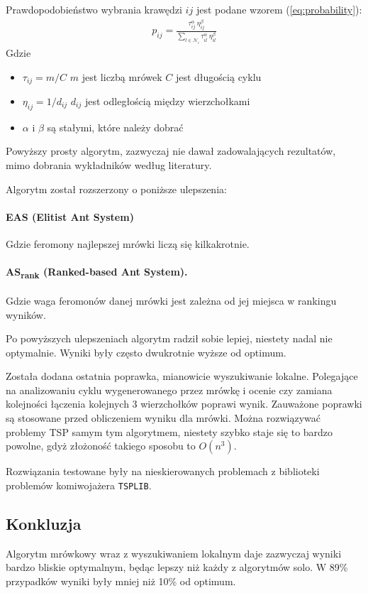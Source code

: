 \documentclass{article}
\begin{document}
Prawdopodobieństwo wybrania krawędzi $ij$ jest podane wzorem
(\ref{eq:probability}):
\begin{align}
    p_{ij} = \frac{\tau_{ij}^\alpha \ \eta_{ij} ^\beta}{\sum_{l\in\mathcal{N}_i} \tau_{il}^\alpha \ \eta_{il} ^\beta} \label{eq:probability}
\end{align}
Gdzie
\begin{itemize}
    \item $\tau_{ij} = m/C$
          \subitem $m$ jest liczbą mrówek
          \subitem $C$ jest długością cyklu
    \item $\eta_{ij} = 1/d_{ij}$
          \subitem $d_{ij}$ jest odległością między wierzchołkami
    \item $\alpha$ i $\beta$ są stałymi, które należy dobrać
\end{itemize}

Powyższy prosty algorytm, zazwyczaj nie dawał zadowalających rezultatów, mimo
dobrania wykładników według literatury. \cite{MIT}

Algorytm został rozszerzony o poniższe ulepszenia:
\paragraph{EAS (Elitist Ant System)}
Gdzie feromony najlepszej mrówki liczą się kilkakrotnie.
\paragraph{AS\textsubscript{rank} (Ranked-based Ant System).}
Gdzie waga feromonów danej mrówki jest zależna od jej miejsca w rankingu
wyników.

Po powyższych ulepszeniach algorytm radził sobie lepiej, niestety nadal nie
optymalnie. Wyniki były często dwukrotnie wyższe od optimum.

Została dodana ostatnia poprawka, mianowicie wyszukiwanie lokalne. Polegające na
analizowaniu cyklu wygenerowanego przez mrówkę i ocenie czy zamiana kolejności
łączenia kolejnych 3 wierzchołków poprawi wynik. Zauważone poprawki są stosowane
przed obliczeniem wyniku dla mrówki. Można rozwiązywać problemy TSP samym tym
algorytmem, niestety szybko staje się to bardzo powolne, gdyż złożoność takiego
sposobu to $O(n^3)$.

Rozwiązania testowane były na nieskierowanych problemach z
biblioteki problemów komiwojażera {\tt TSPLIB}.


\subsection{Konkluzja}
Algorytm mrówkowy wraz z wyszukiwaniem lokalnym daje zazwyczaj wyniki bardzo
bliskie optymalnym, będąc lepszy niż każdy z algorytmów solo. W 89\% przypadków
wyniki były mniej niż 10\% od optimum.

% 
\printbibliography
\end{document}
